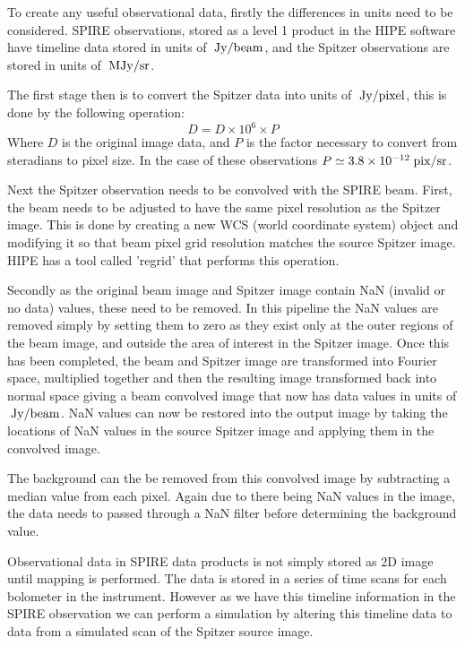 To create any useful observational data, firstly the differences in units need to be considered. SPIRE observations, stored as a level 1 product in the HIPE software have timeline data stored in units of $\;\mathrm{Jy/beam}$, and the Spitzer observations are stored in units of $\;\mathrm{MJy/sr}$.

The first stage then is to convert the Spitzer data into units of $\;\mathrm{Jy/pixel}$, this is done by the following operation:
\[ D = D \times 10^6 \times P \]
Where $D$ is the original image data, and $P$ is the factor necessary to convert from steradians to pixel size. In the case of these observations $P\simeq 3.8\times10^{-12}\;\mathrm{pix/sr}$.

Next the Spitzer observation needs to be convolved with the SPIRE beam. First, the beam needs to be adjusted to have the same pixel resolution as the Spitzer image. This is done by creating a new WCS (world coordinate system) object and modifying it so that beam pixel grid resolution matches the source Spitzer image. HIPE has a tool called 'regrid' that performs this operation.

Secondly as the original beam image and Spitzer image contain NaN (invalid or no data) values, these need to be removed. In this pipeline the NaN values are removed simply by setting them to zero as they exist only at the outer regions of the beam image, and outside the area of interest in the Spitzer image. Once this has been completed, the beam and Spitzer image are transformed into Fourier space, multiplied together and then the resulting image transformed back into normal space giving a beam convolved image that now has data values in units of $\;\mathrm{Jy/beam}$. NaN values can now be restored into the output image by taking the locations of NaN values in the source Spitzer image and applying them in the convolved image.

The background can the be removed from this convolved image by subtracting a median value from each pixel. Again due to there being NaN values in the image, the data needs to passed through a NaN filter before determining the background value.

Observational data in SPIRE data products is not simply stored as 2D image until mapping is performed. The data is stored in a series of time scans for each bolometer in the instrument. However as we have this timeline information in the SPIRE observation we can perform a simulation by altering this timeline data to data from a simulated scan of the Spitzer source image.

